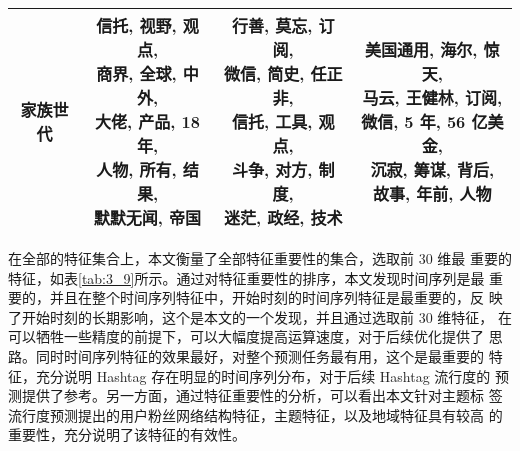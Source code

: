 \begin{enumerate}
\begin{table}[H]
\begin{tabular}{c|c|c|c}
		\textbf{家族世代} & \tabincell{c}{信托, 视野, 观点,
		\\商界, 全球, 中外,
		\\大佬, 产品, 18 年,
		\\人物, 所有, 结果,
		\\默默无闻, 帝国} & \tabincell{c}{行善, 莫忘, 订阅,
		\\ 微信, 简史, 任正非,
		\\信托, 工具, 观点,
		\\斗争, 对方, 制度,
		\\迷茫, 政经, 技术} & \tabincell{c}{美国通用, 海尔, 惊天,
		\\马云, 王健林, 订阅,
		\\ 微信, 5 年, 56 亿美金,
		\\ 沉寂, 筹谋, 背后,
		\\故事, 年前, 人物} \\ 
        	\hline
    \end{tabular}
     
\end{table}

\end{enumerate}

在全部的特征集合上，本文衡量了全部特征重要性的集合，选取前 30 维最 重要的特征，如表\ref{tab:3_9}所示。通过对特征重要性的排序，本文发现时间序列是最 重要的，并且在整个时间序列特征中，开始时刻的时间序列特征是最重要的，反 映了开始时刻的长期影响，这个是本文的一个发现，并且通过选取前 30 维特征， 在可以牺牲一些精度的前提下，可以大幅度提高运算速度，对于后续优化提供了 思路。同时时间序列特征的效果最好，对整个预测任务最有用，这个是最重要的 特征，充分说明 Hashtag 存在明显的时间序列分布，对于后续 Hashtag 流行度的 预测提供了参考。另一方面，通过特征重要性的分析，可以看出本文针对主题标 签流行度预测提出的用户粉丝网络结构特征，主题特征，以及地域特征具有较高 的重要性，充分说明了该特征的有效性。



